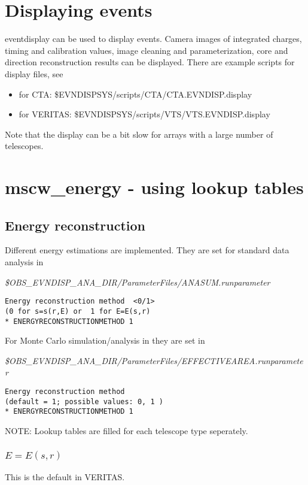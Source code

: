 \documentclass[titlepage,a4paper,twoside,11pt]{report}
\begin{document}
\chapter{Displaying events}

eventdisplay can be used to display events. 
Camera images of integrated charges, timing and calibration values, image cleaning and parameterization, core and direction reconstruction results can be displayed. 
There are example scripts for display files, see

\begin{itemize}
\item for CTA:  \$EVNDISPSYS/scripts/CTA/CTA.EVNDISP.display
\item for VERITAS:  \$EVNDISPSYS/scripts/VTS/VTS.EVNDISP.display
\end{itemize} 

Note that the display can be a bit slow for arrays with a large number of telescopes.

\chapter{mscw\_energy - using lookup tables}

\section{Energy reconstruction}
\label{SECTION.ENERGYRECONSTRUCTION} 

Different energy estimations are implemented. They are set for standard data analysis in 

{\it \$OBS\_EVNDISP\_ANA\_DIR/ParameterFiles/ANASUM.runparameter} 
\begin{lstlisting}
Energy reconstruction method  <0/1> 
(0 for s=s(r,E) or  1 for E=E(s,r) 
* ENERGYRECONSTRUCTIONMETHOD 1
\end{lstlisting}

For Monte Carlo simulation/analysis in they are set in 

{\it \$OBS\_EVNDISP\_ANA\_DIR/ParameterFiles/EFFECTIVEAREA.runparameter}
\begin{lstlisting}
Energy reconstruction method
(default = 1; possible values: 0, 1 )
* ENERGYRECONSTRUCTIONMETHOD 1
\end{lstlisting}
NOTE: Lookup tables are filled for each telescope type seperately. 

\subsection{$E=E(s,r)$}
This is the default in VERITAS. 
\end{document}
